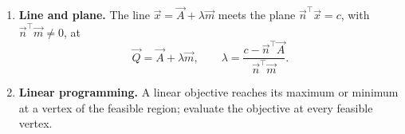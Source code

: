 \begin{enumerate}[label=\normalfont 1.1.\arabic*.,ref=1.1.\arabic*]
\begin{equation*}\tag{1.1.15.1}
T_n=h\left[\frac{f(x_0)+f(x_n)}{2}+\sum_{k=1}^{n-1}f(x_k)\right],\qquad
\int_a^bf(x)\,dx=\lim_{n\to\infty}T_n
\end{equation*}
when $f$ is continuous on $[a,b]$.
\item \label{formula-1-1-16} \textbf{Line and plane.} The line $\vec{x}=\vec{A}+\lambda\vec{m}$ meets the plane $\vec{n}^{\top}\vec{x}=c$, with $\vec{n}^{\top}\vec{m}\ne0$, at
\begin{equation*}\tag{1.1.16.1}
\vec{Q}=\vec{A}+\lambda\vec{m},\qquad\lambda=\frac{c-\vec{n}^{\top}\vec{A}}{\vec{n}^{\top}\vec{m}}.
\end{equation*}
\item \label{formula-1-1-17} \textbf{Linear programming.} A linear objective reaches its maximum or minimum at a vertex of the feasible region; evaluate the objective at every feasible vertex.
\end{enumerate}
